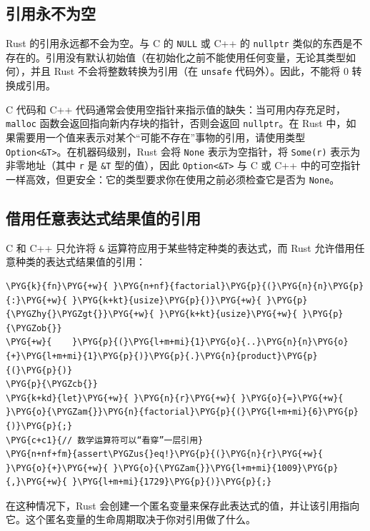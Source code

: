 \subsection{引用永不为空}

Rust 的引用永远都不会为空。与 C 的 \texttt{NULL} 或 C++ 的 \texttt{nullptr} 类似的东西是不存在的。引用没有默认初始值（在初始化之前不能使用任何变量，无论其类型如何），并且 Rust 不会将整数转换为引用（在 \texttt{unsafe} 代码外）。因此，不能将 0 转换成引用。

C 代码和 C++ 代码通常会使用空指针来指示值的缺失：当可用内存充足时，\texttt{malloc} 函数会返回指向新内存块的指针，否则会返回 \texttt{nullptr}。在 Rust 中，如果需要用一个值来表示对某个“可能不存在”事物的引用，请使用类型 \texttt{Option<\&T>}。在机器码级别，Rust 会将 \texttt{None} 表示为空指针，将 \texttt{Some(r)} 表示为非零地址（其中 \texttt{r} 是 \texttt{\&T} 型的值），因此 \texttt{Option<\&T>} 与 C 或 C++ 中的可空指针一样高效，但更安全：它的类型要求你在使用之前必须检查它是否为 \texttt{None}。

\subsection{借用任意表达式结果值的引用}

C 和 C++ 只允许将 \texttt{\&} 运算符应用于某些特定种类的表达式，而 Rust 允许借用任意种类的表达式结果值的引用：

\begin{Verbatim}[commandchars=\\\{\},breaklines=true,breakanywhere=true,fontsize=\codefont,xleftmargin=17bp]
\PYG{k}{fn}\PYG{+w}{ }\PYG{n+nf}{factorial}\PYG{p}{(}\PYG{n}{n}\PYG{p}{:}\PYG{+w}{ }\PYG{k+kt}{usize}\PYG{p}{)}\PYG{+w}{ }\PYG{p}{\PYGZhy{}\PYGZgt{}}\PYG{+w}{ }\PYG{k+kt}{usize}\PYG{+w}{ }\PYG{p}{\PYGZob{}}
\PYG{+w}{    }\PYG{p}{(}\PYG{l+m+mi}{1}\PYG{o}{..}\PYG{n}{n}\PYG{o}{+}\PYG{l+m+mi}{1}\PYG{p}{)}\PYG{p}{.}\PYG{n}{product}\PYG{p}{(}\PYG{p}{)}
\PYG{p}{\PYGZcb{}}
\PYG{k+kd}{let}\PYG{+w}{ }\PYG{n}{r}\PYG{+w}{ }\PYG{o}{=}\PYG{+w}{ }\PYG{o}{\PYGZam{}}\PYG{n}{factorial}\PYG{p}{(}\PYG{l+m+mi}{6}\PYG{p}{)}\PYG{p}{;}
\PYG{c+c1}{// 数学运算符可以“看穿”一层引用}
\PYG{n+nf+fm}{assert\PYGZus{}eq!}\PYG{p}{(}\PYG{n}{r}\PYG{+w}{ }\PYG{o}{+}\PYG{+w}{ }\PYG{o}{\PYGZam{}}\PYG{l+m+mi}{1009}\PYG{p}{,}\PYG{+w}{ }\PYG{l+m+mi}{1729}\PYG{p}{)}\PYG{p}{;}
\end{Verbatim}

在这种情况下，Rust 会创建一个匿名变量来保存此表达式的值，并让该引用指向它。这个匿名变量的生命周期取决于你对引用做了什么。

